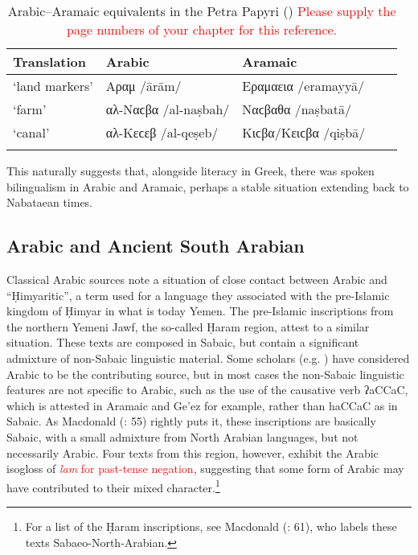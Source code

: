 \documentclass[output=paper]{langsci/langscibook}
\begin{document}
\begin{table}[H]
\caption{Arabic--Aramaic equivalents in the Petra Papyri (\citealt{Al-Jallad2018Petra}) \textcolor{red}{Please supply the page numbers of your chapter for this reference.}}
\label{tab:Petra}
\begin{tabular}{lllll}
\lsptoprule
Translation & Arabic & Aramaic \\
\midrule
`land markers' & \multicolumn{1}{l}{Αραμ /ārām/} & \multicolumn{1}{l}{Εραμαεια /eramayyā/}  \\
`farm' & \multicolumn{1}{l}{αλ-Ναϲβα /al-naṣbah/} & \multicolumn{1}{l}{Ναϲβαθα /naṣbatā/}  \\
`canal' & \multicolumn{1}{l}{αλ-Κεϲεβ /al-qeṣeb/} & \multicolumn{1}{l}{Κιϲβα/Κειϲβα /qiṣbā/}  \\
\lspbottomrule
\end{tabular}
\end{table}

This naturally suggests that, alongside literacy in Greek, there was spoken bilingualism in Arabic and Aramaic, perhaps a stable situation extending back to Nabataean times. 

\subsection{Arabic and Ancient South Arabian}
Classical Arabic sources note a situation of close contact between Arabic and “Ḥimyaritic”, a term used for a language they associated with the pre-Islamic kingdom of Ḥimyar in what is today Yemen. The pre-Islamic inscriptions from the northern Yemeni Jawf, the so-called Ḥaram region, attest to a similar situation. These texts are composed in Sabaic, but contain a significant admixture of non-Sabaic linguistic material. Some scholars (e.g. \citealt{Robin1991}) have considered Arabic to be the contributing source, but in most cases the non-Sabaic linguistic features are not specific to Arabic, such as the use of the causative verb ʔaCCaC, which is attested in Aramaic and Ge’ez for example, rather than haCCaC as in Sabaic. As Macdonald (\citeyear{Macdonald2000}: 55) rightly puts it, these inscriptions are basically Sabaic, with a small admixture from North Arabian languages, but not necessarily Arabic. Four texts from this region, however, exhibit the Arabic isogloss of \textcolor{red}{\textit{lam} for past-tense negation}, suggesting that some form of Arabic may have contributed to their mixed character.\footnote{For a list of the Ḥaram inscriptions, see Macdonald (\citeyear{Macdonald2000}: 61), who labels these texts Sabaeo-North-Arabian.}   
\end{document}
